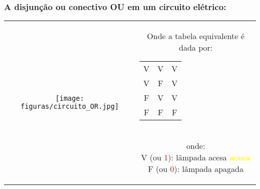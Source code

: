\documentclass{beamer}
\begin{document}
\begin{frame}
\frametitle{A \textbf{disjunção} ou conectivo \textbf{OU}  em um circuito elétrico:}

\begin{tabular}{c||c}  
 
 \texttt{[image: figuras/circuito\_OR.jpg]} 
 
  &
  \parbox{0.4\linewidth}{\vspace{-4cm} Onde a tabela equivalente é dada por:\\
  	\begin{tabular}{|c|c|c|}
	\hline
	$\mathbf{A}$ & $\mathbf{B}$ & $\mathbf{A \vee B}$ \\
	\hline
	V & V & V \\
	\hline
	V & F & V \\
	\hline
	F & V & V \\
	\hline
	F & F & F \\
	\hline
	\end{tabular}\\
  onde:\\
	V (ou  \textcolor{red}{1}): lâmpada acesa \textbf{\textcolor{yellow}{acesa}}\\
	F (ou \textcolor{red}{0}): lâmpada apagada\\

  } %

\end{tabular} 	

\end{frame}
\end{document}
